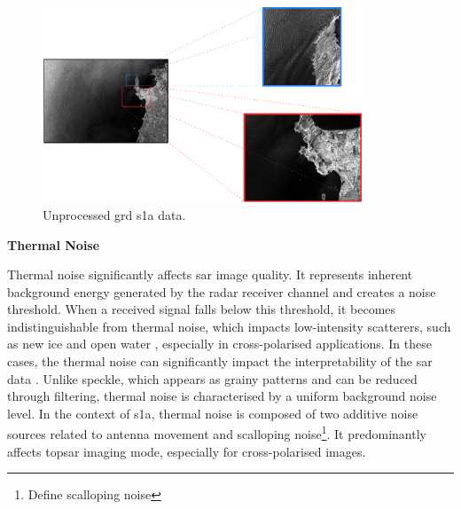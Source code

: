 \begin{figure}[htbp]
    \centering
    \includegraphics[width=0.85\textwidth]{Figures/Theory/unprocessedSARData.pdf}
    \caption{Unprocessed \acs{grd} \acs{s1a} data.}
    \label{fig:theory.data.unprocessed}
\end{figure}

\textbf{Thermal Noise}

Thermal noise significantly affects \acs{sar} image quality. It represents inherent background energy generated by the radar receiver channel and creates a noise threshold. When a received signal falls below this threshold, it becomes indistinguishable from thermal noise, which impacts low-intensity scatterers, such as new ice and open water \cite{Carsey1992}, especially in cross-polarised applications. In these cases, the thermal noise can significantly impact the interpretability of the \acs{sar} data \cite{Carsey1992}. Unlike speckle, which appears as grainy patterns and can be reduced through filtering, thermal noise is characterised by a uniform background noise level. In the context of \acs{s1a}, thermal noise is composed of two additive noise sources related to antenna movement and scalloping noise\footnote{Define scalloping noise}. It predominantly affects \acs{topsar} imaging mode, especially for cross-polarised images.


